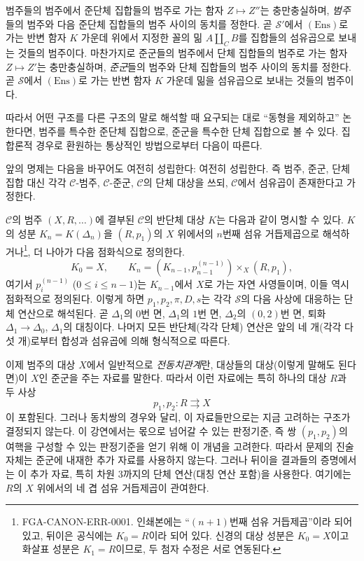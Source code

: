  범주들의 범주에서 준단체 집합들의 범주로 가는
함자 $Z\longmapsto Z''$는 충만충실하며, \emph{범주}들의 범주와 다음
준단체 집합들의 범주 사이의 동치를 정한다. 곧 $\mathcal S'$에서
$(\mathrm{Ens})$로 가는 반변 함자 $K$ 가운데 위에서 지정한 꼴의 밂
$A\amalg_C B$를 집합들의 섬유곱으로 보내는 것들의 범주이다. 마찬가지로
준군들의 범주에서 단체 집합들의 범주로 가는 함자 $Z\longmapsto Z'$는
충만충실하며, \emph{준군}들의 범주와
단체 집합들의 범주 사이의 동치를 정한다. 곧 $\mathcal S$에서
$(\mathrm{Ens})$로 가는 반변 함자 $K$ 가운데 밂을 섬유곱으로 보내는
것들의 범주이다.

따라서 어떤 구조를 다른 구조의 말로 해석할 때 요구되는 대로 ``동형을
제외하고'' 논한다면, 범주를 특수한 준단체 집합으로, 준군을 특수한 단체
집합으로 볼 수 있다. 집합론적 경우로 환원하는 통상적인 방법으로부터
다음이 따른다.

 앞의 명제는 다음을 바꾸어도 여전히 성립한다:
여전히 성립한다. 즉 범주, 준군, 단체 집합 대신 각각
$\mathcal C$-범주, $\mathcal C$-준군, $\mathcal C$의 단체 대상을 쓰되,
$\mathcal C$에서 섬유곱이 존재한다고 가정한다.

$\mathcal C$의 범주 $(X,R,\ldots)$에 결부된 $\mathcal C$의 반단체 대상
$K$는 다음과 같이 명시할 수 있다. $K$의 성분
$K_n=K(\Delta_n)$을 $(R,p_1)$의 $X$ 위에서의 $n$번째 섬유
거듭제곱으로 해석하거나\footnote{FGA-CANON-ERR-0001. 인쇄본에는
“$(n+1)$번째 섬유 거듭제곱”이라 되어 있고, 뒤이은 공식에는
$K_0=R$이라 되어 있다. 신경의 대상 성분은 $K_0=X$이고 화살표
성분은 $K_1=R$이므로, 두 첨자 수정은 서로 연동된다.}, 더 나아가
다음 점화식으로 정의한다.
\[
  K_0=X,\qquad
  K_n=(K_{n-1},p_{n-1}^{(n-1)})\times_X(R,p_1),
\]
여기서 $p_i^{(n-1)}$ ($0\leq i\leq n-1$)는 $K_{n-1}$에서 $X$로 가는
자연 사영들이며, 이들 역시 점화적으로 정의된다. 이렇게 하면
$p_1,p_2,\pi,D,s$는 각각 $\mathcal S$의 다음 사상에 대응하는 단체
연산으로 해석된다. 곧 $\Delta_1$의 $0$번 면, $\Delta_1$의 $1$번
면, $\Delta_2$의 $(0,2)$번 면, 퇴화 $\Delta_1\to\Delta_0$,
$\Delta_1$의 대칭이다. 나머지 모든 반단체(각각 단체) 연산은 앞의
네 개(각각 다섯 개)로부터 합성과 섬유곱에 의해 형식적으로 따른다.

이제 범주의 대상 $X$에서 일반적으로 \emph{전동치관계}란, 대상들의
대상(이렇게 말해도 된다면)이 $X$인 준군을 주는 자료를 말한다. 따라서
이런 자료에는 특히 하나의 대상 $R$과 두 사상
\[
  p_1,p_2:R\rightrightarrows X
\]
이 포함된다. 그러나 동치쌍의 경우와 달리, 이 자료들만으로는 지금
고려하는 구조가 결정되지 않는다. 이 강연에서는 몫으로 넘어갈 수
있는 판정기준, 즉 쌍 $(p_1,p_2)$의 여핵을 구성할 수 있는 판정기준을
얻기 위해 이 개념을 고려한다. 따라서 문제의 진술 자체는 준군에 내재한
추가 자료를 사용하지 않는다. 그러나 뒤이을 결과들의 증명에서는
이 추가 자료, 특히 차원 $3$까지의 단체 연산(대칭 연산 포함)을
사용한다. 여기에는 $R$의 $X$ 위에서의 네 겹 섬유 거듭제곱이 관여한다.

